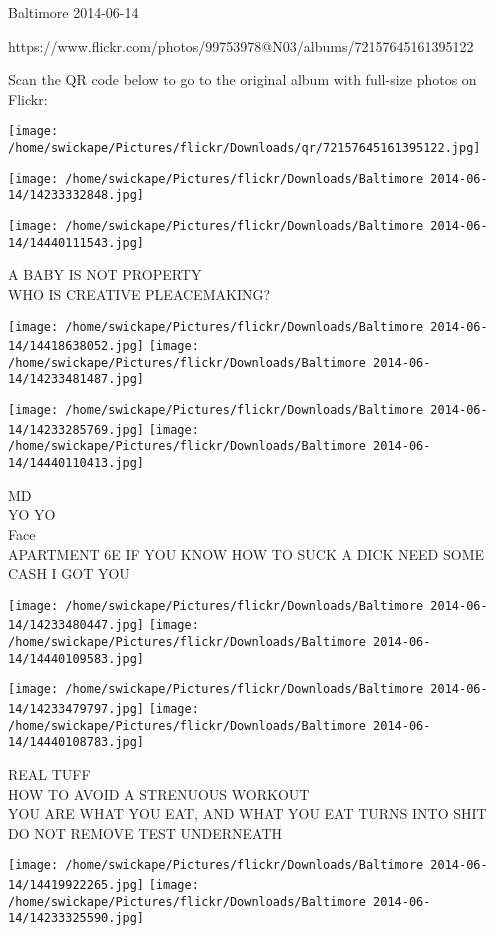 \documentclass[10pt,letterpaper]{article}
\begin{document}
Baltimore 2014-06-14

https://www.flickr.com/photos/99753978@N03/albums/72157645161395122

Scan the QR code below to go to the original album with full-size photos on Flickr:

\texttt{[image: /home/swickape/Pictures/flickr/Downloads/qr/72157645161395122.jpg]}
\pagebreak

\texttt{[image: /home/swickape/Pictures/flickr/Downloads/Baltimore 2014-06-14/14233332848.jpg]}

\vspace{0.25in}
\texttt{[image: /home/swickape/Pictures/flickr/Downloads/Baltimore 2014-06-14/14440111543.jpg]}

A BABY IS NOT PROPERTY\\
WHO IS CREATIVE PLEACEMAKING?
\pagebreak

\texttt{[image: /home/swickape/Pictures/flickr/Downloads/Baltimore 2014-06-14/14418638052.jpg]}
\texttt{[image: /home/swickape/Pictures/flickr/Downloads/Baltimore 2014-06-14/14233481487.jpg]}

\texttt{[image: /home/swickape/Pictures/flickr/Downloads/Baltimore 2014-06-14/14233285769.jpg]}
\texttt{[image: /home/swickape/Pictures/flickr/Downloads/Baltimore 2014-06-14/14440110413.jpg]}

MD\\
YO YO\\
Face\\
APARTMENT 6E IF YOU KNOW HOW TO SUCK A DICK NEED SOME CASH I GOT YOU
\pagebreak

\texttt{[image: /home/swickape/Pictures/flickr/Downloads/Baltimore 2014-06-14/14233480447.jpg]}
\texttt{[image: /home/swickape/Pictures/flickr/Downloads/Baltimore 2014-06-14/14440109583.jpg]}

\texttt{[image: /home/swickape/Pictures/flickr/Downloads/Baltimore 2014-06-14/14233479797.jpg]}
\texttt{[image: /home/swickape/Pictures/flickr/Downloads/Baltimore 2014-06-14/14440108783.jpg]}

REAL TUFF\\
HOW TO AVOID A STRENUOUS WORKOUT\\
YOU ARE WHAT YOU EAT, AND WHAT YOU EAT TURNS INTO SHIT\\
DO NOT REMOVE TEST UNDERNEATH
\pagebreak

\texttt{[image: /home/swickape/Pictures/flickr/Downloads/Baltimore 2014-06-14/14419922265.jpg]}
\texttt{[image: /home/swickape/Pictures/flickr/Downloads/Baltimore 2014-06-14/14233325590.jpg]}
\end{document}
